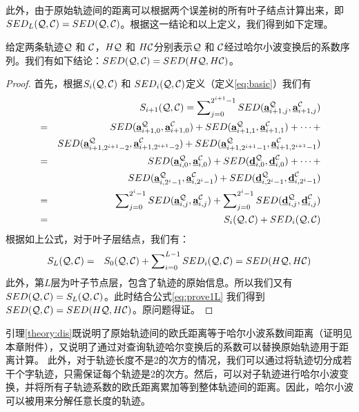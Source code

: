 此外，由于原始轨迹间的距离可以根据两个误差树的所有叶子结点计算出来，即$SED_{L}{(\cal Q, \cal C)} = SED(\cal Q, \cal C)$。根据这一结论和以上定义，我们得到如下定理。
\begin{lemma}\label{theory:dis}
	给定两条轨迹${\cal Q}$ 和 ${\cal C}$，$H{\cal Q}$ 和 $H{\cal C}$分别表示${\cal Q}$ 和 ${\cal C}$经过哈尔小波变换后的系数序列。我们有如下结论：$SED({\cal Q},{\cal C})=SED(H{\cal Q},H{\cal C})$。
\end{lemma}
\begin{proof}
	首先，根据$S_{i}({\cal Q}, {\cal C})$ 和 $SED_{i}({\cal Q}, {\cal C})$定义（定义\ref{eq:basic}）我们有
	\allowdisplaybreaks
	\begin{eqnarray}
	&&	S_{i+1}({\cal Q}, {\cal C})=\sum\nolimits_{j=0}^{2^{i+1}-1}SED(\emph{{\textbf{a}}}_{i+1,j}^{\cal Q},\emph{{\textbf{a}}}_{i+1,j}^{\cal C}) \nonumber \\
	&=&SED(\emph{{\textbf{a}}}_{i+1,0}^{\cal Q},\emph{{\textbf{a}}}_{i+1,0}^{\cal C}) + SED(\emph{{\textbf{a}}}_{i+1,1}^{\cal Q},\emph{{\textbf{a}}}_{i+1,1}^{\cal C}) + \cdots + \nonumber \\
	&\,& SED(\emph{{\textbf{a}}}_{i+1,2^{i+1}-2}^{\cal Q},\emph{{\textbf{a}}}_{i+1,2^{i+1}-2}^{\cal C}) + 	SED(\emph{{\textbf{a}}}_{i+1,2^{i+1}-1}^{\cal Q},\emph{{\textbf{a}}}_{i+1,2^{i+1}-1}^{\cal C}) \nonumber \\
	&=&SED(\emph{{\textbf{a}}}_{i,0}^{\cal Q},\emph{{\textbf{a}}}_{i,0}^{\cal C})  +   SED(\emph{{\textbf{d}}}_{i,0}^{\cal Q}, \emph{{\textbf{d}}}_{i,0}^{\cal C})   + \cdots+\nonumber \\
	&\,& SED(\emph{{\textbf{a}}}_{i,2^{i}-1}^{\cal Q},\emph{{\textbf{a}}}_{i,2^{i}-1}^{\cal C})  +   SED(\emph{{\textbf{d}}}_{i,2^{i}-1}^{\cal Q}, \emph{{\textbf{d}}}_{i,2^{i}-1}^{\cal C})  \nonumber   \nonumber \\
	&=& \sum\nolimits_{j=0}^{2^i-1}SED(\emph{{\textbf{a}}}_{i,j}^{\cal Q}, \emph{{\textbf{a}}}_{i,j}^{\cal C})+ \sum\nolimits_{j=0}^{2^i-1}SED(\emph{{\textbf{d}}}_{i,j}^{\cal Q}, \emph{{\textbf{d}}}_{i,j}^{\cal C})\nonumber \\
	&=&S_{i}({\cal Q}, {\cal C})+SED_{i}({\cal Q},{\cal C})
	\end{eqnarray}
	\allowdisplaybreaks[4]
	根据如上公式，对于叶子层结点，我们有：
	\begin{eqnarray} \label{eq:prove1L}
	S_{L}({\cal Q},{\cal C})&=&S_{0}({\cal Q},{\cal C})+ \sum\nolimits_{i=0}^{L-1}{SED_{i}({\cal Q},{\cal C})} = SED(H{\cal Q},H{\cal C})
	\end{eqnarray}
	此外，第$L$层为叶子节点层，包含了轨迹的原始信息。所以我们又有$SED({\cal Q},{\cal C}) = S_{L}({\cal Q},{\cal C})$。此时结合公式\ref{eq:prove1L}
	我们得到 $SED({\cal Q},{\cal C})=SED(H{\cal Q},H{\cal C})$。原问题得证。
\end{proof}
引理\ref{theory:dis}既说明了原始轨迹间的欧氏距离等于哈尔小波系数间距离（证明见本章附件），又说明了通过对查询轨迹哈尔变换后的系数可以替换原始轨迹用于距离计算。
此外，对于轨迹长度不是2的次方的情况，我们可以通过将轨迹切分成若干个字轨迹，只需保证每个轨迹是2的次方。然后，可以对子轨迹进行哈尔小波变换，并将所有子轨迹系数的欧氏距离累加等到整体轨迹间的距离。因此，哈尔小波可以被用来分解任意长度的轨迹。

